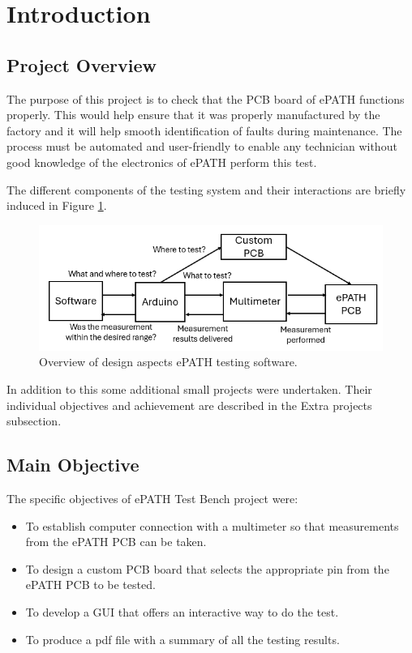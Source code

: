 \section{Introduction}
\subsection{Project Overview}
The purpose of this project is to check that the PCB board of ePATH functions properly. This would help ensure that it was properly manufactured by the factory and it will help smooth identification of faults during maintenance. The process must be automated and user-friendly to enable any technician without good knowledge of the electronics of ePATH perform this test. 

The different components of the testing system and their interactions are briefly induced in Figure \ref{end_goal_diagram}.


\begin{figure}[H]
          \centering
          \includegraphics[width=1\linewidth]{img/General end goal diagram.png}
          \caption{Overview of design aspects ePATH testing software.}
          \label{end_goal_diagram}
    \end{figure}

In addition to this some additional small projects were undertaken. Their individual objectives and achievement are described in the Extra projects subsection.

\subsection{Main Objective}
The specific objectives of ePATH Test Bench project were: 
\begin{itemize}
\item To establish computer connection with a multimeter so that measurements from the ePATH PCB can be taken.
\item To design a custom PCB board that selects the appropriate pin from the ePATH PCB to be tested.
\item To develop a GUI that offers an interactive way to do the test.
\item To produce a pdf file with a summary of all the testing results.
\end{itemize}


